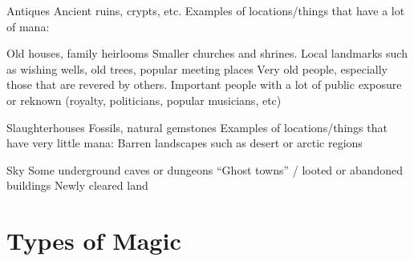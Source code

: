 \documentclass[twoside]{book}
\begin{document}
              Antiques   
              Ancient ruins, crypts, etc.   
            Examples of locations/things that have a lot of mana:
               
              Old houses, family heirlooms   
              Smaller churches and shrines.   
                Local landmarks such as wishing wells, old trees,
               popular meeting places 
                Very old people, especially those that are revered
               by others. 
                Important people with a lot of public exposure or
               reknown (royalty, politicians, popular musicians, etc)
               
              Slaughterhouses   
              Fossils, natural gemstones   
            Examples of locations/things that have very little
             mana:   
                Barren landscapes such as desert or arctic regions
               
              Sky   
              Some underground caves or dungeons   
                “Ghost towns” / looted or abandoned
               buildings 
              Newly cleared land   
          
\section{Types of Magic}
    
\end{document}
